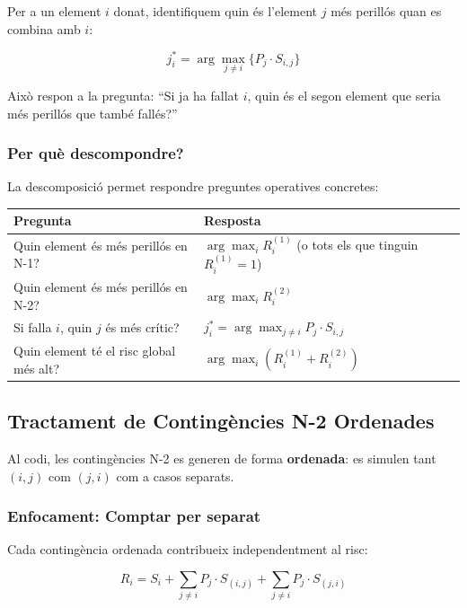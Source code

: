 \documentclass[11pt,a4paper]{article}
\begin{document}
Per a un element $i$ donat, identifiquem quin és l'element $j$ més perillós quan es combina amb $i$:

\begin{equation}
\boxed{j^*_i = \arg\max_{j \neq i} \{ P_j \cdot S_{i,j} \}}
\end{equation}

Això respon a la pregunta: ``Si ja ha fallat $i$, quin és el segon element que seria més perillós que també fallés?''

\subsubsection*{Per què descompondre?}

La descomposició permet respondre preguntes operatives concretes:

\begin{table}[htbp]
\centering
\renewcommand{\arraystretch}{1.3}
\begin{tabular}{p{7cm} p{7cm}}
\toprule
\textbf{Pregunta} & \textbf{Resposta} \\
\midrule
Quin element és més perillós en N-1? & $\arg\max_i R_i^{(1)}$ (o tots els que tinguin $R_i^{(1)} = 1$) \\
Quin element és més perillós en N-2? & $\arg\max_i R_i^{(2)}$ \\
Si falla $i$, quin $j$ és més crític? & $j^*_i = \arg\max_{j \neq i} P_j \cdot S_{i,j}$ \\
Quin element té el risc global més alt? & $\arg\max_i (R_i^{(1)} + R_i^{(2)})$ \\
\bottomrule
\end{tabular}
\end{table}

\subsection{Tractament de Contingències N-2 Ordenades}

Al codi, les contingències N-2 es generen de forma \textbf{ordenada}: es simulen tant $(i,j)$ com $(j,i)$ com a casos separats.

\subsubsection*{Enfocament: Comptar per separat}

Cada contingència ordenada contribueix independentment al risc:

\begin{equation}
R_i = S_i + \sum_{j \neq i} P_j \cdot S_{(i,j)} + \sum_{j \neq i} P_j \cdot S_{(j,i)}
\end{equation}
\end{document}

